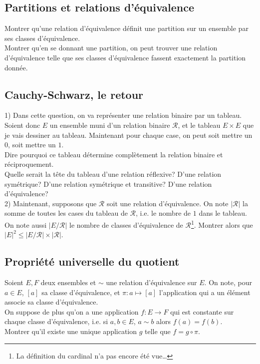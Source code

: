 \documentclass{article}
\begin{document}
\subsection{Partitions et relations d'\'equivalence}
Montrer qu'une relation d'\'equivalence d\'efinit une partition sur un ensemble par ses classes d'\'equivalence.\\
Montrer qu'en se donnant une partition, on peut trouver une relation d'\'equivalence telle que ses classes d'\'equivalence fassent exactement la partition donn\'ee.

\subsection{Cauchy-Schwarz, le retour}
1) Dans cette question, on va repr\'esenter une relation binaire par un tableau. Soient donc $E$ un ensemble muni d'un relation binaire $\mathcal{R}$, et le tableau $E\times E$ que je vais dessiner au tableau. Maintenant pour chaque case, on peut soit mettre un $0$, soit mettre un $1$.\\
Dire pourquoi ce tableau d\'etermine compl\`etement la relation binaire et r\'eciproquement.\\
Quelle serait la t\^ete du tableau d'une relation r\'eflexive? D'une relation sym\'etrique? D'une relation sym\'etrique et transitive? D'une relation d'\'equivalence?\\
2) Maintenant, supposons que $\mathcal{R}$ soit une relation d'\'equivalence. On note $|\mathcal{R}|$ la somme de toutes les cases du tableau de $\mathcal{R}$, i.e. le nombre de $1$ dans le tableau. On note aussi $|E/\mathcal{R}|$ le nombre de classes d'\'equivalence de $\mathcal{R}$\footnote{La d\'efinition du cardinal n'a pas encore \'et\'e vue\dots}. Montrer alors que $|E|^2\leq|E/\mathcal{R}|\times|\mathcal{R}|$.

\subsection{Propri\'et\'e universelle du quotient}
Soient $E,F$ deux ensembles et $\sim$ une relation d'\'equivalence sur $E$. On note, pour $a\in E$, $[a]$ sa classe d'\'equivalence, et $\pi:a\mapsto[a]$ l'application qui a un \'el\'ement associe sa classe d'\'equivalence.\\
On suppose de plus qu'on a une application $f:E\to F$ qui est constante sur chaque classe d'\'equivalence, i.e. si $a,b\in E$, $a\sim b$ alors $f(a)=f(b)$.\\
Montrer qu'il existe une unique application $g$ telle que $f=g\circ\pi$.
\end{document}
